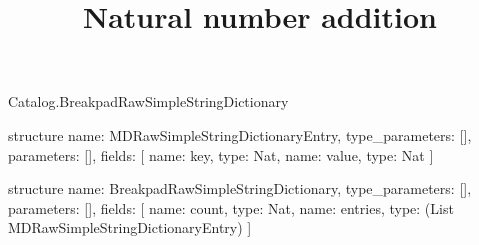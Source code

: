 \begin{lexlean}{Catalog.BreakpadRawSimpleStringDictionary}
\title{Natural number addition}
\begin{semanticmodule}
structure{
  name: MDRawSimpleStringDictionaryEntry,
  type_parameters: [],
  parameters: [],
  fields: [
    {name: key, type: Nat},
    {name: value, type: Nat}
  ]
}

structure{
  name: BreakpadRawSimpleStringDictionary,
  type_parameters: [],
  parameters: [],
  fields: [
    {name: count, type: Nat},
    {name: entries, type: (List MDRawSimpleStringDictionaryEntry)}
  ]
}
\end{semanticmodule}
\end{lexlean}
